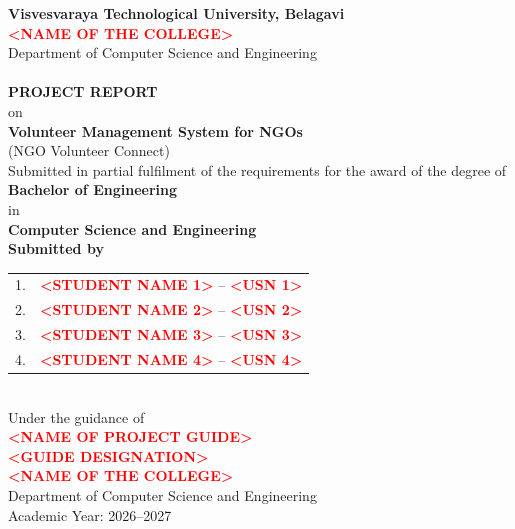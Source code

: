 \documentclass[12pt,a4paper,oneside]{report}
\newcommand{\projecttitle}{Volunteer Management System for NGOs}
\newcommand{\applicationname}{NGO Volunteer Connect}
\newcommand{\college}{\placeholder{NAME OF THE COLLEGE}}
\newcommand{\department}{Department of Computer Science and Engineering}
\newcommand{\university}{Visvesvaraya Technological University, Belagavi}
\newcommand{\academicyear}{2026--2027}
\newcommand{\degree}{Bachelor of Engineering}
\newcommand{\branch}{Computer Science and Engineering}
\newcommand{\guide}{\placeholder{NAME OF PROJECT GUIDE}}
\newcommand{\guideDesignation}{\placeholder{GUIDE DESIGNATION}}
\newcommand{\placeholder}[1]{\textbf{\textcolor{red}{\textless #1\textgreater}}}
\begin{document}
\begin{titlepage}
\begin{center}
{\Large\bfseries \university}\\[5pt]
{\large \college}\\[3pt]
{\large \department}\\[18pt]

\\[16pt]

{\Large\bfseries PROJECT REPORT}\\[8pt]
{\large on}\\[8pt]
{\LARGE\bfseries\color{Navy} \projecttitle}\\[5pt]
{\large (\applicationname)}\\[18pt]

Submitted in partial fulfilment of the requirements for the award of the degree of\\[5pt]
{\large\bfseries \degree}\\
in\\
{\large\bfseries \branch}\\[18pt]

\textbf{Submitted by}\\[8pt]
\begin{tabular}{ll}
1. & \placeholder{STUDENT NAME 1} \quad -- \quad \placeholder{USN 1}\\
2. & \placeholder{STUDENT NAME 2} \quad -- \quad \placeholder{USN 2}\\
3. & \placeholder{STUDENT NAME 3} \quad -- \quad \placeholder{USN 3}\\
4. & \placeholder{STUDENT NAME 4} \quad -- \quad \placeholder{USN 4}
\end{tabular}\\[18pt]

Under the guidance of\\[4pt]
{\large\bfseries \guide}\\
\guideDesignation\\[16pt]

{\large\bfseries \college}\\
\department\\[5pt]
Academic Year: \academicyear

\end{center}
\end{titlepage}
\end{document}
